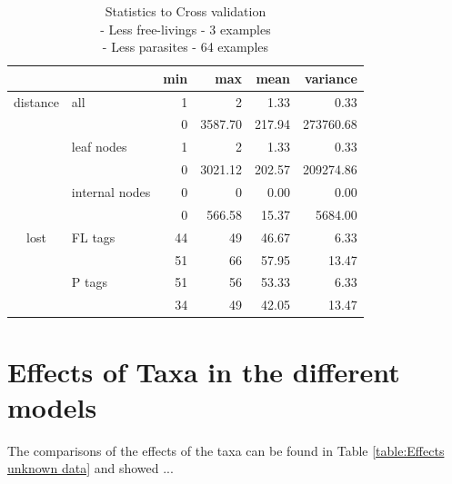       \begin{table}
        \begin{center}
          \begin{tabular}{ |cl||r|r|r|r| }
            \hline
            & & min & max & mean & variance \\
            \hline \hline
            \rowcolor{green!50}distance & all   & 1 & 2 & 1.33 & 0.33 \\
            \rowcolor{orange!50}&               & 0 & 3587.70 & 217.94 & 273760.68 \\
            \rowcolor{green!50}& leaf nodes     & 1 & 2 & 1.33 & 0.33 \\
            \rowcolor{orange!50}&               & 0 & 3021.12 & 202.57 & 209274.86 \\
            \rowcolor{green!50}& internal nodes& 0 & 0 & 0.00 & 0.00 \\
            \rowcolor{orange!50}&               & 0 & 566.58 & 15.37 & 5684.00 \\ \hline
            \rowcolor{green!50}lost & FL tags   & 44 & 49 & 46.67 & 6.33 \\
            \rowcolor{orange!50}&               & 51 & 66 & 57.95 & 13.47 \\
            \rowcolor{green!50}& P tags         & 51 & 56 & 53.33 & 6.33 \\
            \rowcolor{orange!50}&               & 34 & 49 & 42.05 & 13.47 \\
            \hline
          \end{tabular}
        \end{center}
        \caption{Statistics to Cross validation \\
          - \colorbox{green!50}{Less free-livings - 3 examples} \\
          - \colorbox{orange!50}{Less parasites - 64 examples}}
      \end{table}

  \section{Effects of Taxa in the different models}

    The comparisons of the effects of the taxa can be found in Table \ref{table:Effects unknown data} 
    and showed ...

